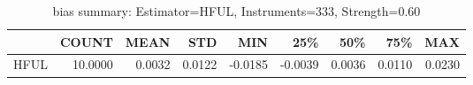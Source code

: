\begin{table}[ht]
\centering
\caption{bias summary: Estimator=HFUL, Instruments=333, Strength=0.60}
\begin{tabular}{lrrrrrrrr}
\toprule
 & COUNT & MEAN & STD & MIN & 25\% & 50\% & 75\% & MAX \\
\midrule
HFUL & 10.0000 & 0.0032 & 0.0122 & -0.0185 & -0.0039 & 0.0036 & 0.0110 & 0.0230 \\
\bottomrule
\end{tabular}
\end{table}

